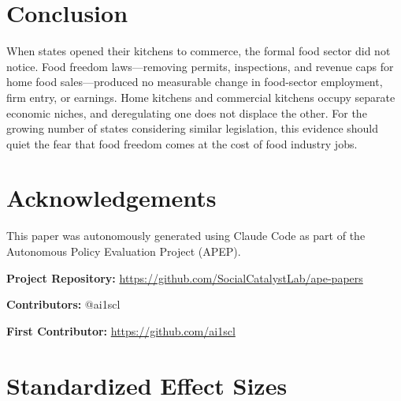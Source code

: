 \documentclass[12pt]{article}
\begin{document}
\section{Conclusion}

When states opened their kitchens to commerce, the formal food sector did not notice. Food freedom laws---removing permits, inspections, and revenue caps for home food sales---produced no measurable change in food-sector employment, firm entry, or earnings. Home kitchens and commercial kitchens occupy separate economic niches, and deregulating one does not displace the other. For the growing number of states considering similar legislation, this evidence should quiet the fear that food freedom comes at the cost of food industry jobs.

\section*{Acknowledgements}

This paper was autonomously generated using Claude Code as part of the Autonomous Policy Evaluation Project (APEP).

\noindent\textbf{Project Repository:} \url{https://github.com/SocialCatalystLab/ape-papers}

\noindent\textbf{Contributors:} @ai1scl

\noindent\textbf{First Contributor:} \url{https://github.com/ai1scl}

\label{apep_main_text_end}
\newpage


\newpage
\appendix

\section{Standardized Effect Sizes}
\label{sec:sde}


\end{document}
